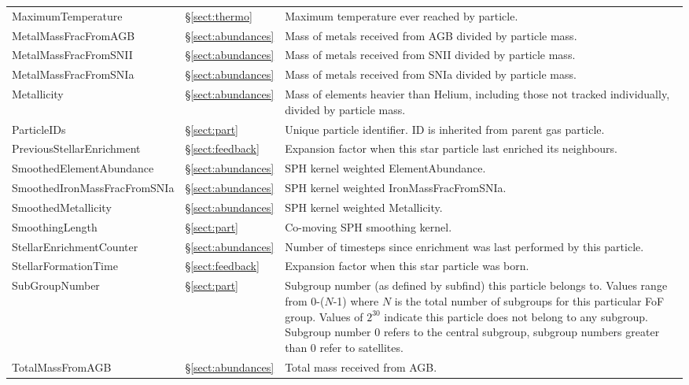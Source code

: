 \documentclass[10pt, a4paper]{article}
\newcommand{\subgroupnumber}{Subgroup number (as defined by {\sc subfind}) this
particle belongs to. Values range from 0-($N$-1) where $N$ is the total number
of subgroups for this particular FoF group. Values of $2^{30}$ indicate this
particle does not belong to any subgroup. Subgroup number 0 refers to the
central subgroup, subgroup numbers greater than 0 refer to satellites.}
\begin{document}
\begin{table}
\begin{center}
\begin{tabular}{>{\ttfamily}p{4cm}p{1.5cm}p{11cm}}
MaximumTemperature &
\S\ref{sect:thermo} & Maximum temperature ever reached by particle. \\

MetalMassFracFromAGB &
\S\ref{sect:abundances} &
Mass of metals received from AGB divided by particle mass. \\

MetalMassFracFromSNII &
\S\ref{sect:abundances}  &
Mass of metals received from SNII divided by particle mass. \\

MetalMassFracFromSNIa &
\S\ref{sect:abundances}  &
Mass of metals received from SNIa divided by particle mass. \\

Metallicity &
\S\ref{sect:abundances}  & Mass of elements heavier than Helium, including
those not tracked individually,  divided by particle mass. \\

ParticleIDs &
\S\ref{sect:part} &
Unique particle identifier. ID is inherited from parent gas particle. \\

PreviousStellarEnrichment &
\S\ref{sect:feedback} &
Expansion factor when this star particle last enriched its neighbours. \\

SmoothedElementAbundance &
\S\ref{sect:abundances}  &
SPH kernel weighted ElementAbundance. \\

SmoothedIronMassFracFromSNIa &
\S\ref{sect:abundances}  &
SPH kernel weighted IronMassFracFromSNIa. \\

SmoothedMetallicity &
\S\ref{sect:abundances}  &
SPH kernel weighted Metallicity. \\

SmoothingLength &
\S\ref{sect:part} &
Co-moving SPH smoothing kernel. \\

StellarEnrichmentCounter &
\S\ref{sect:abundances}  &
Number of timesteps since enrichment was last performed by this particle. \\

StellarFormationTime &
\S\ref{sect:feedback} &
Expansion factor when this star particle was born. \\

SubGroupNumber &
\S\ref{sect:part} &
\subgroupnumber \\

TotalMassFromAGB &
\S\ref{sect:abundances} &
Total mass received from AGB. \\


\end{tabular}
\end{center}
\end{table}
\end{document}
